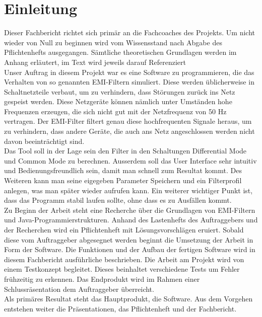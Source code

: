 \section{Einleitung} \label{sec:einleitung}
Dieser Fachbericht richtet sich primär an die Fachcoaches des Projekts. Um nicht wieder von Null zu beginnen wird vom Wissensstand nach Abgabe des Pflichtenhefts ausgegangen. Sämtliche theoretischen Grundlagen werden im Anhang erläutert, im Text wird jeweils darauf Referenziert\\

Unser Auftrag in diesem Projekt war es eine Software zu programmieren, die das Verhalten von so genannten EMI-Filtern simuliert. Diese werden üblicherweise in Schaltnetzteile verbaut, um zu verhindern, dass Störungen zurück ins Netz gespeist werden. Diese Netzgeräte können nämlich unter Umständen hohe Frequenzen erzeugen, die sich nicht gut mit der Netzfrequenz von 50 Hz vertragen. Der EMI-Filter filtert genau diese hochfrequenten Signale heraus, um zu verhindern, dass andere  Geräte, die auch ans Netz angeschlossen werden nicht davon beeinträchtigt sind.\\

Das Tool soll in der Lage sein den Filter in den Schaltungen Differential Mode und Common Mode zu berechnen. Ausserdem soll das User Interface sehr intuitiv und Bedienungsfreundlich sein, damit man schnell zum Resultat kommt. Des Weiteren kann man seine eigegeben Parameter Speichern und ein Filterprofil anlegen, was man später wieder aufrufen kann. Ein weiterer wichtiger Punkt ist, dass das Programm stabil laufen sollte, ohne dass es zu Ausfällen kommt.\\

Zu Beginn der Arbeit steht eine Recherche über die Grundlagen von EMI-Filtern und Java-Programmierstrukturen. Anhand des Lastenhefts des Auftraggebers und der Recherchen wird ein Pflichtenheft mit Lösungsvorschlägen eruiert. Sobald diese vom Auftraggeber abgesegnet werden beginnt die Umsetzung der Arbeit in Form der Software. Die Funktionen und der Aufbau der fertigen Software wird in diesem Fachbericht ausführliche beschrieben. Die Arbeit am Projekt wird von einem Testkonzept begleitet. Dieses beinhaltet verschiedene Tests um Fehler frühzeitig zu erkennen. Das Endprodukt wird im Rahmen einer Schlussräsentation dem Auftraggeber überreicht.\\

Als primäres Resultat steht das Hauptprodukt, die Software. Aus dem Vorgehen entstehen weiter die Präsentationen, das Pflichtenheft und der Fachbericht.\\

